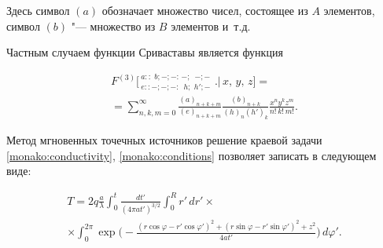 Здесь символ $ (a) $ обозначает множество чисел, состоящее из $ A $ элементов, символ $ (b) $ "--- множество из $ B $ элементов и~т.д. 









Частным случаем функции Сриваставы является  функция 

\begin{multline}

\label{monako:srivastava}

F^{(3)}\bigg[\,^{\displaystyle a::\,\,b;-;-:\,-;\,\,\,-;-}_{\displaystyle e::-;-;-:\,\,\,h;\,\,h';-}\,\,\bigg.\bigg|\,x,\,y,\,z\bigg]=\\ =\sum_{n,k,m=0}^\infty\frac{(a)_{n+k+m}}{(e)_{n+k+m}}\frac{(b)_{n+k}}{(h)_{n}(h')_{k}}\frac{x^ny^kz^m}{n!\,k!\,m!}.

\end{multline}






\smallskip




Метод мгновенных точечных источников \cite{manako:eger} решение краевой задачи  \eqref{monako:conductivity}, \eqref{monako:conditions} позволяет   записать в следующем виде:

\begin{multline}

T=2q\frac{a}{\lambda}\int _0^t\frac{dt'}{(4 \pi at')^{3/2}} \int _0^R r'\,dr'\times\\

\label{monako:triple}

\times\int _0^{2\pi}\exp\bigg(-\frac{(r\cos \varphi-r' \cos \varphi')^2+(r\sin \varphi-r' \sin \varphi')^2+z^2}{4at'}  \bigg)\,d\varphi'.

\end{multline}



